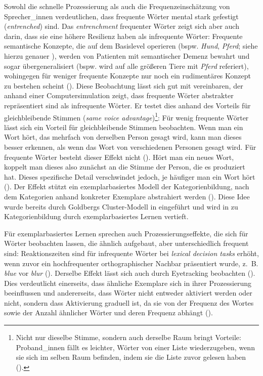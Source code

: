 Sowohl die schnelle Prozessierung als auch die Frequenzeinschätzung von Sprecher\_innen verdeutlichen, dass frequente Wörter mental stark gefestigt (\textit{entrenched}) sind. Das \textit{entrenchment} frequenter Wörter zeigt sich aber auch darin, dass sie eine höhere Resilienz haben als infrequente Wörter: Frequente semantische Konzepte, die auf dem Basislevel operieren (bspw. \textit{Hund}, \textit{Pferd}; siehe hierzu genauer ), werden von Patienten mit semantischer Demenz bewahrt und sogar übergeneralisiert (bspw. wird auf alle größeren Tiere mit \textit{Pferd} referiert), wohingegen für weniger frequente
 Konzepte nur noch ein rudimentäres Konzept zu bestehen scheint (\cite[12]{Rogers.2003}). Diese Beobachtung lässt sich gut mit \textcite[255]{Goldinger.1998} vereinbaren, der anhand einer Computersimulation zeigt, dass frequente Wörter abstrakter repräsentiert sind als infrequente Wörter. Er testet dies anhand des Vorteils für gleichbleibende Stimmen (\textit{same voice advantage})\footnote{Nicht nur dieselbe Stimme, sondern auch derselbe Raum bringt Vorteile: Proband\_innen fällt es leichter, Wörter von einer Liste wiederzugeben, wenn sie sich im selben Raum befinden, indem sie die Liste zuvor gelesen haben (\cite[14]{Goldberg.2019}).}: Für wenig frequente Wörter lässt sich ein Vorteil für gleichbleibende Stimmen beobachten. Wenn man ein Wort hört, das mehrfach von derselben Person gesagt wird, kann man dieses besser erkennen, als wenn das Wort von verschiedenen Personen gesagt wird. Für frequente Wörter besteht dieser Effekt nicht (\cite[153]{Ellis.2002b}). Hört man ein neues Wort, koppelt man dieses also zunächst an die Stimme der Person, die es produziert hat. Dieses spezifische Detail verschwindet jedoch, je häufiger man ein Wort hört (\cite[254--255]{Goldinger.1998}). Der Effekt stützt ein exemplarbasiertes Modell der Kategorienbildung, nach dem Kategorien anhand konkreter Exemplare abstrahiert werden (\cite[153]{Ellis.2002b}). Diese Idee wurde bereits durch Goldbergs Cluster-Modell in  eingeführt und wird in  zu Kategorienbildung durch exemplarbasiertes Lernen vertieft. 



Für exemplarbasiertes Lernen sprechen auch Prozessierungseffekte, die sich für Wörter beobachten lassen, die ähnlich aufgebaut, aber unterschiedlich frequent sind: Reaktionszeiten sind für infrequente Wörter bei \textit{lexical decision tasks} erhöht, wenn zuvor ein hochfrequenter orthographischer Nachbar präsentiert wurde, z.~B. \textit{blue} vor \textit{blur} (\cite{Grainger.1989, Grainger.1990}). Derselbe Effekt lässt sich auch durch Eyetracking beobachten (\cite{Grainger.1989}). Dies verdeutlicht einerseits, dass ähnliche Exemplare sich in ihrer Prozessierung beeinflussen und andererseits, dass Wörter nicht entweder aktiviert werden oder nicht, sondern dass Aktivierung graduell ist, da sie von der Frequenz des Wortes sowie der Anzahl ähnlicher Wörter und deren Frequenz abhängt (\cite[150--152]{Ellis.2002b}). 



